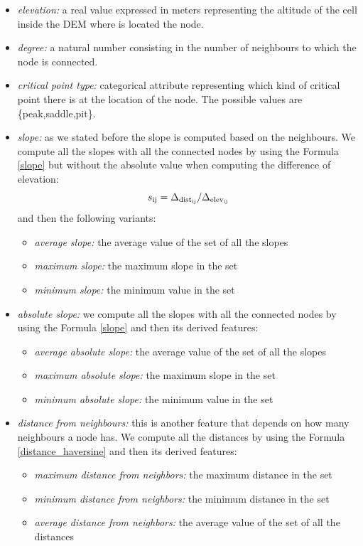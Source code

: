 \begin{itemize}
\item \textit{elevation:} a real value expressed in meters representing the altitude of the cell inside the DEM where is located the node.
\item \textit{degree:} a natural number consisting in the number of neighbours to which the node is connected.
\item \textit{critical point type:} categorical attribute representing which kind of critical point there is at the location of the node. The possible values are \{peak,saddle,pit\}.
\item \textit{slope:} as we stated before the slope is computed based on the neighbours. We compute all the slopes with all the connected nodes by using the Formula \ref{slope} but without the absolute value when computing the difference of elevation:
\begin{equation} 
s\textsubscript{ij} = \Delta \textsubscript{dist\textsubscript{ij}} / \Delta \textsubscript{elev\textsubscript{ij}}
\end{equation} 
and then the following variants: 
\begin{itemize}
\item \textit{average slope:} the average value of the set of all the slopes
\item \textit{maximum slope:} the maximum slope in the set
\item \textit{minimum slope:} the minimum value in the set
\end{itemize}
\item \textit{absolute slope:} we compute all the slopes with all the connected nodes by using the Formula \ref{slope} and then its derived features:
\begin{itemize}
\item \textit{average absolute slope:} the average value of the set of all the slopes
\item \textit{maximum absolute slope:} the maximum slope in the set
\item \textit{minimum absolute slope:} the minimum value in the set
\end{itemize}
\item \textit{distance from neighbours:} this is another feature that depends on how many neighbours a node has. We compute all the distances by using the Formula \ref{distance_haversine} and then its derived features:
\begin{itemize}
\item \textit{maximum distance from neighbors:} the maximum distance in the set
\item \textit{minimum distance from neighbors:} the minimum distance in the set
\item \textit{average distance from neighbors:} the average value of the set of all the distances
\end{itemize}
\end{itemize}


